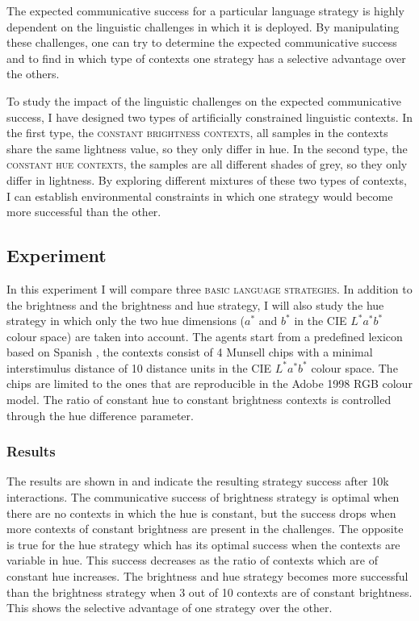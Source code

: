 The expected communicative success for a particular language strategy
is highly dependent on the linguistic challenges in which it is
deployed. By manipulating these challenges, one can try to determine
the expected communicative success and to find in which type of
contexts one strategy has a selective advantage over the others.

To study the impact of the linguistic challenges on the expected
communicative success, I have designed two types of artificially
constrained linguistic contexts. In the first type, the \textsc{constant
  brightness contexts}, all samples in the contexts share the same
lightness value, so they only differ in hue. In the second type, the
\textsc{constant hue contexts}, the samples are all different shades of
grey, so they only differ in lightness. By exploring different
mixtures of these two types of contexts, I can establish environmental
constraints in which one strategy would become more successful than
the other.

\subsection{Experiment}
\label{s:ls-selective-advantage-experiment}

In this experiment I will compare three \textsc{basic language
  strategies}. In addition to the brightness and the
brightness and hue strategy, I will also study the hue
  strategy in which only the two hue dimensions ($a^*$ and $b^*$ in
the CIE $L^*a^*b^*$ colour space) are taken into account. The agents
start from a predefined lexicon based on Spanish
\citep{lillo07locating}, the contexts consist of 4 Munsell chips
with a minimal interstimulus distance of 10 distance units in
the CIE $L^*a^*b^*$ colour space. The chips are limited to the ones
that are reproducible in the Adobe 1998 RGB colour model. The ratio
of constant hue to constant brightness contexts is controlled through
the hue difference parameter.

\subsubsection{Results}

The results are shown in  and
indicate the resulting strategy success after 10k interactions. The
communicative success of brightness strategy is optimal when
there are no contexts in which the hue is constant, but the success
drops when more contexts of constant brightness are present in the
challenges. The opposite is true for the hue strategy which has
its optimal success when the contexts are variable in hue. This
success decreases as the ratio of contexts which are of constant hue
increases. The brightness and hue strategy becomes more
successful than the brightness strategy when 3 out of 10
contexts are of constant brightness. This shows the selective
advantage of one strategy over the other.

